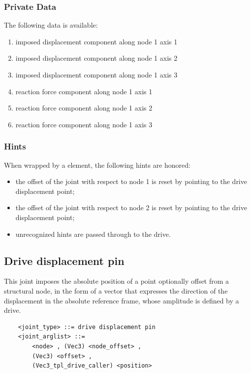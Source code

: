 \subsubsection{Private Data}
The following data is available:
\begin{enumerate}
\item {} imposed displacement component along node 1 axis 1
\item {} imposed displacement component along node 1 axis 2
\item {} imposed displacement component along node 1 axis 3
\item {} reaction force component along node 1 axis 1
\item {} reaction force component along node 1 axis 2
\item {} reaction force component along node 1 axis 3
\end{enumerate}

\subsubsection{Hints}
When wrapped by a  element, the following hints are honored:
\begin{itemize}
\item {} the offset of the joint
with respect to node 1 is reset by pointing 
to the drive displacement point;
\item {} the offset of the joint
with respect to node 2 is reset by pointing 
to the drive displacement point;
\item unrecognized hints are passed through to the  drive.
\end{itemize}



\subsection{Drive displacement pin}
\label{sec:EL:JOINT:DRIVEDISPLACEMENTPIN}
This joint imposes the absolute position of a point optionally offset
from a structural node, in the form of a vector that expresses 
the direction of the displacement in the absolute reference frame,
whose amplitude is defined by a drive.
\begin{verbatim}
    <joint_type> ::= drive displacement pin
    <joint_arglist> ::= 
        <node> , (Vec3) <node_offset> ,
        (Vec3) <offset> ,
        (Vec3_tpl_drive_caller) <position>
\end{verbatim}


